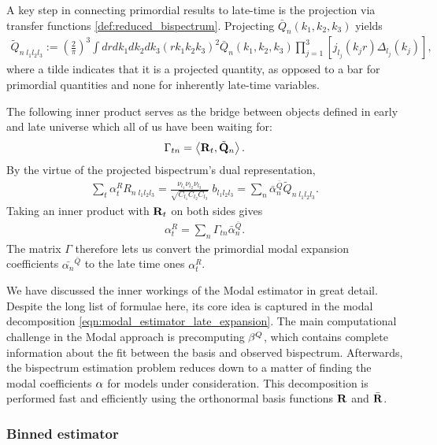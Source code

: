 A key step in connecting primordial results to late-time is the projection via transfer functions \eqref{def:reduced_bispectrum}. Projecting $\bar{Q}_n(k_1,k_2,k_3)$ yields
\begin{align}
	\tilde{Q}_{n \; l_1 l_2 l_3} := \left( \frac{2}{\pi} \right)^3 \int dr dk_1 dk_2 dk_3 \left(r k_1 k_2 k_3 \right)^2 \bar{Q}_n (k_1, k_2, k_3) \prod_{j=1}^{3} \left[ j_{l_j} (k_j r) \Delta_{l_j} (k_j) \right],
\end{align}
where a tilde indicates that it is a projected quantity, as opposed to a bar for primordial quantities and none for inherently late-time variables. 

The following inner product serves as the bridge between objects defined in early and late universe which all of us have been waiting for:
\begin{align}
	\Gamma_{tn} = \left< \mathbf{R}_{t}, \tilde{\mathbf{Q}}_n \right>.
\end{align}
By the virtue of the projected bispectrum's dual representation,
\begin{align}
	\sum_t \alpha^R_t R_{n \; l_1 l_2 l_3} = \frac{\nu_{l_1} \nu_{l_2} \nu_{l_3}}{\sqrt{C_{l_1} C_{l_2} C_{l_3}}} \; b_{l_1 l_2 l_3} = \sum_n \bar{\alpha}^{\bar{Q}}_n \tilde{Q}_{n \; l_1 l_2 l_3}.
\end{align}
Taking an inner product with $\mathbf{R}_t$ on both sides gives
\begin{align}
	\alpha^R_t = \sum_n \Gamma_{tn} \bar{\alpha}^{\bar{Q}}_n.
\end{align}
The matrix $\Gamma$ therefore lets us convert the primordial modal expansion coefficients $\bar{\alpha_n}^{\bar{Q}}$ to the late time ones $\alpha_t^{R}$.

\hspace{10pt}

We have discussed the inner workings of the Modal estimator in great detail. Despite the long list of formulae here, its core idea is captured in the modal decomposition \eqref{eqn:modal_estimator_late_expansion}. The main computational challenge in the Modal approach is precomputing $\mathbf{\beta}^Q$, which contains complete information about the fit between the basis and observed bispectrum. Afterwards, the bispectrum estimation problem reduces down to a matter of finding the modal coefficients $\mathbf{\alpha}$ for models under consideration. This decomposition is performed fast and efficiently using the orthonormal basis functions $\mathbf{R}$ and $\bar{\mathbf{R}}$.

\subsubsection*{Binned estimator}


